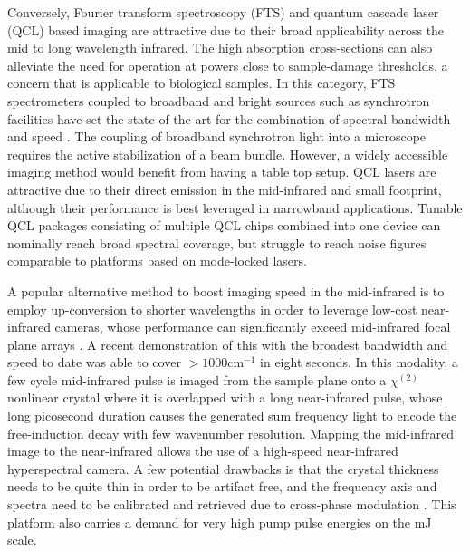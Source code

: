 \documentclass{optica-article}
\begin{document}
Conversely, Fourier transform spectroscopy (FTS) and quantum cascade laser (QCL) based imaging are attractive due to their broad applicability across the mid to long wavelength infrared. The high absorption cross-sections can also alleviate the need for operation at powers close to sample-damage thresholds, a concern that is applicable to biological samples. In this category, FTS spectrometers coupled to broadband and bright sources such as synchrotron facilities have set the state of the art for the combination of spectral bandwidth and speed \cite{nasseHighresolutionFouriertransformInfrared2011}. The coupling of broadband synchrotron light into a microscope requires the active stabilization of a beam bundle. However, a widely accessible imaging method would benefit from having a table top setup. QCL lasers are attractive due to their direct emission in the mid-infrared and small footprint, although their performance is best leveraged in narrowband applications. Tunable QCL packages consisting of multiple QCL chips combined into one device \cite{yehFastInfraredChemical2015,goyalActiveHyperspectralImaging2014,zimmerleiterQCLbasedMidinfraredHyperspectral2021} can nominally reach broad spectral coverage, but struggle to reach noise figures comparable to platforms based on mode-locked lasers.



A popular alternative method to boost imaging speed in the mid-infrared is to employ up-conversion to shorter wavelengths in order to leverage low-cost near-infrared cameras, whose performance can significantly exceed mid-infrared focal plane arrays \cite{junaidVideorateMidinfraredHyperspectral2019,knezInfraredChemicalImaging2020,potmaRapidChemicallySelective2021}. A recent demonstration of this with the broadest bandwidth and speed to date was able to cover \mbox{$>$$1000 \mathrm{cm^{-1}}$} \cite{zhaoHighspeedScanlessEntire2023} in eight seconds. In this modality, a few cycle mid-infrared pulse is imaged from the sample plane onto a $\chi^{(2)}$ nonlinear crystal where it is overlapped with a long near-infrared pulse, whose long picosecond duration causes the generated sum frequency light to encode the free-induction decay with few wavenumber resolution. Mapping the mid-infrared image to the near-infrared allows the use of a high-speed near-infrared hyperspectral camera. A few potential drawbacks is that the crystal thickness needs to be quite thin in order to be artifact free, and the frequency axis and spectra need to be calibrated and retrieved due to cross-phase modulation \cite{leeRemovingCrossphaseModulation2009}. This platform also carries a demand for very high pump pulse energies on the mJ scale. 
\end{document}
